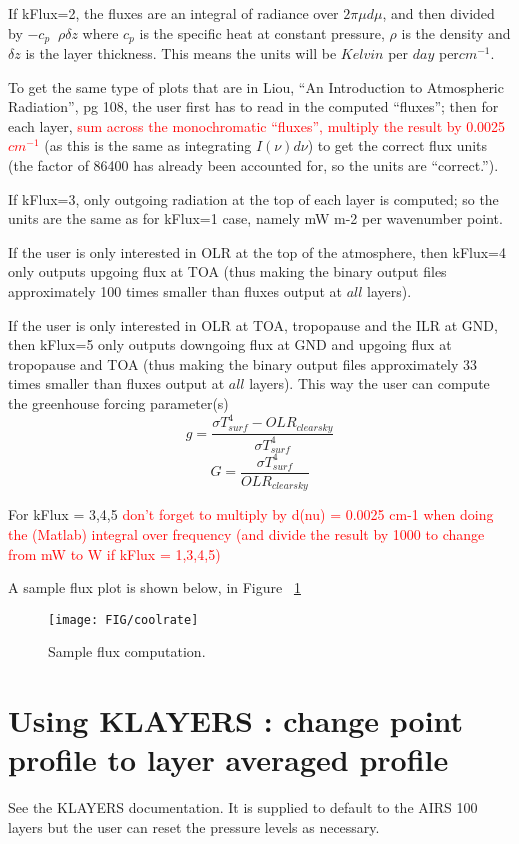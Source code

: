 \documentclass[12pt]{article}
\begin{document}
If kFlux=2, the fluxes are an integral of radiance over $2\pi \mu d\mu$, and 
then divided by $-c_{p} \;\; \rho \delta z$ where $c_{p}$ is the specific heat
at constant pressure, $\rho$ is the density and $\delta z$ is the layer 
thickness. This means the units will be $Kelvin$ per $day$ per$cm^{-1}$. 

To get the same type of plots that are in Liou, ``An Introduction to 
Atmospheric Radiation'', pg 108, the user first has to read in the computed 
``fluxes''; then for each layer, 
\textcolor{red}{sum across the monochromatic ``fluxes'', multiply the result 
by 0.0025 $cm^{-1}$} (as this is the same as integrating $I(\nu) d\nu$) to 
get the correct flux units (the factor of 86400 has already been accounted 
for, so the units are ``correct.''). 

If kFlux=3, only outgoing radiation at the top of each layer is computed; so 
the units are the same as for kFlux=1 case, namely  mW m-2 per wavenumber 
point. 

If the user is only interested in OLR at the top of the atmosphere, 
then kFlux=4 only outputs upgoing flux at TOA (thus making the binary output 
files approximately 100 times smaller than fluxes output at $all$ layers).

If the user is only interested in OLR at TOA, tropopause and the ILR at GND, 
then kFlux=5 only outputs downgoing flux at GND and upgoing flux at 
tropopause and TOA (thus making the binary output files approximately 33 times
smaller than fluxes output at $all$ layers). This way the user can compute the
greenhouse forcing parameter(s) \cite{fre:96,sod:95}
\[
g = \frac{\sigma T_{surf}^4 - OLR_{clearsky}}{\sigma T_{surf}^4}
\]
\[
G = \frac{\sigma T_{surf}^4}{OLR_{clearsky}}
\]

For kFlux = 3,4,5
\textcolor{red}{don't forget to multiply by d(nu) = 0.0025 cm-1 
                when doing the (Matlab) integral over frequency (and divide 
                the result by 1000 to change from mW to W if kFlux = 1,3,4,5)}

A sample flux plot is shown below, in Figure ~\ref{sampleflux}

\begin{figure}
\texttt{[image: FIG/coolrate]}
\caption{Sample flux computation.}
\label{sampleflux}
\end{figure}

\section{Using KLAYERS : change point profile to layer averaged profile}
See the KLAYERS documentation. It is supplied to default to the AIRS 100 layers
but the user can reset the pressure levels as necessary.
\end{document}
